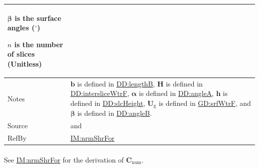 \documentclass[12pt]{article}
\begin{document}
\begin{minipage}{\textwidth}
\begin{tabular}{>{\raggedright}p{}>{\raggedright\arraybackslash}p{}}
\begin{symbDescription}
              \item{$\symbf{β}$ is the surface angles (${{}^{\circ}}$)}
              \item{$n$ is the number of slices (Unitless)}
              \end{symbDescription}
\\ \midrule
Notes & $\symbf{b}$ is defined in \hyperref[DD:lengthB]{DD:lengthB}, $\symbf{H}$ is defined in \hyperref[DD:intersliceWtrF]{DD:intersliceWtrF}, $\symbf{α}$ is defined in \hyperref[DD:angleA]{DD:angleA}, $\symbf{h}$ is defined in \hyperref[DD:slcHeight]{DD:slcHeight}, ${\symbf{U}_{\text{g}}}$ is defined in \hyperref[GD:srfWtrF]{GD:srfWtrF}, and $\symbf{β}$ is defined in \hyperref[DD:angleB]{DD:angleB}.
        
\\ \midrule
Source & \cite{chen2005} and \cite{karchewski2012}
         
\\ \midrule
RefBy & \hyperref[IM:nrmShrFor]{IM:nrmShrFor}
        
\\ \bottomrule
\end{tabular}
\end{minipage}

\paragraph{}
\label{IM:nrmShrForNumDeriv}
See \hyperref[IM:nrmShrFor]{IM:nrmShrFor} for the derivation of ${\symbf{C}_{\text{num}}}$.
\end{document}
